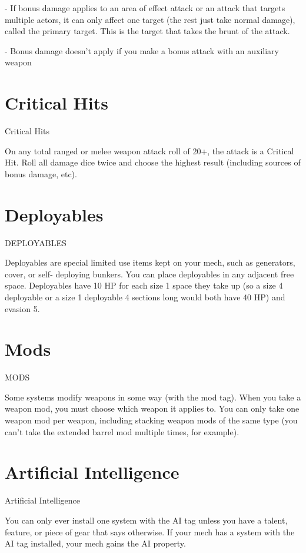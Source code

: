          	- If bonus damage applies to an area of effect attack or an attack that targets multiple
         actors, it can only affect one target (the rest just take normal damage), called the primary
         target. This is the target that takes the brunt of the attack.

         	- Bonus damage doesn’t apply if you make a bonus attack with an auxiliary weapon
\section{Critical Hits}
                                                Critical Hits

On any total ranged or melee weapon attack roll of 20+, the attack is a Critical Hit. Roll all
damage dice twice and choose the highest result (including sources of bonus damage, etc).
\section{Deployables}
                                             DEPLOYABLES

Deployables are special limited use items kept on your mech, such as generators, cover, or self-
deploying bunkers. You can place deployables in any adjacent free space. Deployables have 10
HP for each size 1 space they take up (so a size 4 deployable or a size 1 deployable 4 sections
long would both have 40 HP) and evasion 5.
\section{Mods}
                                                    MODS

Some systems modify weapons in some way (with the mod tag). When you take a weapon mod,
you must choose which weapon it applies to. You can only take one weapon mod per weapon,
including stacking weapon mods of the same type (you can’t take the extended barrel mod
multiple times, for example).
\section{Artificial Intelligence}
                                        Artificial Intelligence

You can only ever install one system with the AI tag unless you have a talent, feature, or piece
of gear that says otherwise. If your mech has a system with the AI tag installed, your mech gains
the AI property.


